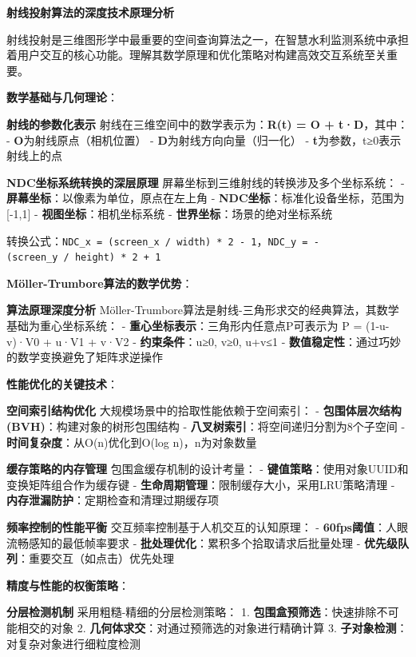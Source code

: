 \textbf{射线投射算法的深度技术原理分析}

射线投射是三维图形学中最重要的空间查询算法之一，在智慧水利监测系统中承担着用户交互的核心功能。理解其数学原理和优化策略对构建高效交互系统至关重要。

\textbf{数学基础与几何理论}：

\textbf{射线的参数化表示} 射线在三维空间中的数学表示为：\textbf{R(t) = O + t·D}，其中： - \textbf{O}为射线原点（相机位置） - \textbf{D}为射线方向向量（归一化） - \textbf{t}为参数，t≥0表示射线上的点

\textbf{NDC坐标系统转换的深层原理} 屏幕坐标到三维射线的转换涉及多个坐标系统： - \textbf{屏幕坐标}：以像素为单位，原点在左上角 - \textbf{NDC坐标}：标准化设备坐标，范围为{[}-1,1{]} - \textbf{视图坐标}：相机坐标系统 - \textbf{世界坐标}：场景的绝对坐标系统

转换公式：\texttt{NDC\_x\ =\ (screen\_x\ /\ width)\ *\ 2\ -\ 1}，\texttt{NDC\_y\ =\ -(screen\_y\ /\ height)\ *\ 2\ +\ 1}

\textbf{Möller-Trumbore算法的数学优势}：

\textbf{算法原理深度分析} Möller-Trumbore算法是射线-三角形求交的经典算法，其数学基础为重心坐标系统： - \textbf{重心坐标表示}：三角形内任意点P可表示为 P = (1-u-v)·V0 + u·V1 + v·V2 - \textbf{约束条件}：u≥0, v≥0, u+v≤1 - \textbf{数值稳定性}：通过巧妙的数学变换避免了矩阵求逆操作

\textbf{性能优化的关键技术}：

\textbf{空间索引结构优化} 大规模场景中的拾取性能依赖于空间索引： - \textbf{包围体层次结构(BVH)}：构建对象的树形包围结构 - \textbf{八叉树索引}：将空间递归分割为8个子空间 - \textbf{时间复杂度}：从O(n)优化到O(log n)，n为对象数量

\textbf{缓存策略的内存管理} 包围盒缓存机制的设计考量： - \textbf{键值策略}：使用对象UUID和变换矩阵组合作为缓存键 - \textbf{生命周期管理}：限制缓存大小，采用LRU策略清理 - \textbf{内存泄漏防护}：定期检查和清理过期缓存项

\textbf{频率控制的性能平衡} 交互频率控制基于人机交互的认知原理： - \textbf{60fps阈值}：人眼流畅感知的最低帧率要求 - \textbf{批处理优化}：累积多个拾取请求后批量处理 - \textbf{优先级队列}：重要交互（如点击）优先处理

\textbf{精度与性能的权衡策略}：

\textbf{分层检测机制} 采用粗糙-精细的分层检测策略： 1. \textbf{包围盒预筛选}：快速排除不可能相交的对象 2. \textbf{几何体求交}：对通过预筛选的对象进行精确计算 3. \textbf{子对象检测}：对复杂对象进行细粒度检测

